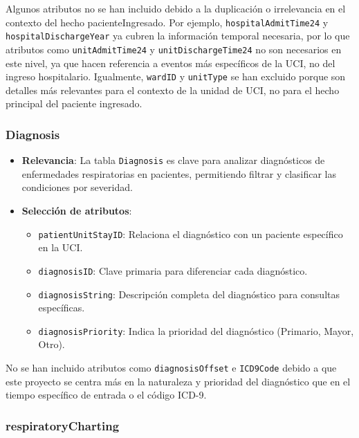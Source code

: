\documentclass[12pt, a4paper, twoside]{article}
\begin{document}
	Algunos atributos no se han incluido debido a la duplicación o irrelevancia en el contexto del hecho pacienteIngresado. Por ejemplo, \texttt{hospitalAdmitTime24} y \texttt{hospitalDischargeYear}  ya cubren la información temporal necesaria, por lo que atributos como \texttt{unitAdmitTime24}  y \texttt{unitDischargeTime24} no son necesarios en este nivel, ya que hacen referencia a eventos más específicos de la UCI, no del ingreso hospitalario. Igualmente, \texttt{wardID} y \texttt{unitType} se han excluido porque son detalles más relevantes para el contexto de la unidad de UCI, no para el hecho principal del paciente ingresado.  \cite{eICU2024}
	
	
	\subsubsection{Diagnosis} 
	
	\begin{itemize}
		\item \textbf{Relevancia}: La tabla \texttt{Diagnosis} es clave para analizar diagnósticos de enfermedades respiratorias en pacientes, permitiendo filtrar y clasificar las condiciones por severidad.
		
		\item \textbf{Selección de atributos}:
		\begin{itemize}
			\item \texttt{patientUnitStayID}: Relaciona el diagnóstico con un paciente específico en la UCI.
			\item \texttt{diagnosisID}: Clave primaria para diferenciar cada diagnóstico.
			\item \texttt{diagnosisString}: Descripción completa del diagnóstico para consultas específicas.
			\item \texttt{diagnosisPriority}: Indica la prioridad del diagnóstico (Primario, Mayor, Otro).
		\end{itemize}
	\end{itemize}
	
	No se han incluido atributos como \texttt{diagnosisOffset} e \texttt{ICD9Code} debido a que este proyecto se centra más en la naturaleza y prioridad del diagnóstico que en el tiempo específico de entrada o el código ICD-9. \cite{eICU2024}
	
	\subsubsection{respiratoryCharting}
	
\end{document}
